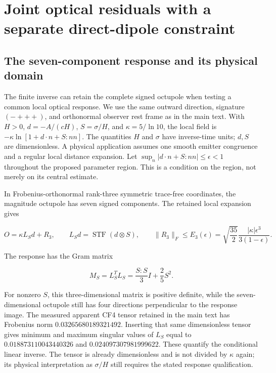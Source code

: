 \hypertarget{joint-optical-residuals-with-a-separate-direct-dipole-constraint}{%
\section{Joint optical residuals with a separate direct-dipole
constraint}\label{joint-optical-residuals-with-a-separate-direct-dipole-constraint}}

\hypertarget{the-seven-component-response-and-its-physical-domain}{%
\subsection{The seven-component response and its physical
domain}\label{the-seven-component-response-and-its-physical-domain}}

The finite inverse can retain the complete signed octupole when testing
a common local optical response. We use the same outward direction,
signature \((-+++)\), and orthonormal observer rest frame as in the main
text. With \(H>0\), \(d=-A/(cH)\), \(S=\sigma/H\), and
\(\kappa=5/\ln 10\), the local field is \(-\kappa\ln[1+d\cdot n+S:nn]\).
The quantities \(H\) and \(\sigma\) have inverse-time units; \(d,S\) are
dimensionless. A physical application assumes one smooth emitter
congruence and a regular local distance expansion. Let
\(\sup_n|d\cdot n+S:nn|\leq\epsilon<1\) throughout the proposed
parameter region. This is a condition on the region, not merely on its
central estimate.

In Frobenius-orthonormal rank-three symmetric trace-free coordinates,
the magnitude octupole has seven signed components. The retained local
expansion gives \cite{QOMethods}

\begin{equation}
O=\kappa L_Sd+R_3,\qquad
 L_Sd=\operatorname{STF}(d\otimes S),\qquad
 \|R_3\|_F\leq E_3(\epsilon)
 =\sqrt{\frac{35}{2}}\frac{|\kappa|\epsilon^3}{3(1-\epsilon)}.\tag{A1}
\end{equation}

The response has the Gram matrix

\begin{equation}
M_S=L_S^TL_S=\frac{S:S}{3}I+\frac25 S^2.\tag{A2}
\end{equation}

For nonzero \(S\), this three-dimensional matrix is positive definite,
while the seven-dimensional octupole still has four directions
perpendicular to the response image. The measured apparent CF4 tensor
retained in the main text has Frobenius norm \(0.03265680189321492\).
Inserting that same dimensionless tensor gives minimum and maximum
singular values of \(L_S\) equal to \(0.018873110043440326\) and
\(0.024097307981999622\). These quantify the conditional linear inverse.
The tensor is already dimensionless and is not divided by \(\kappa\)
again; its physical interpretation as \(\sigma/H\) still requires the
stated response qualification.

